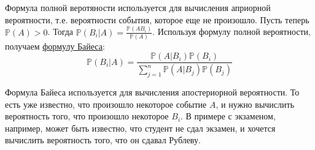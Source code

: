 \documentclass[12pt]{article}
\numberwithin{Th}{section}
\numberwithin{Def}{section}
\numberwithin{Lem}{section}
\numberwithin{St}{section}
\numberwithin{equation}{section}
\newcommand\Pro{\mathbb{P}}
\begin{document}
Формула полной веротяности используется для вычисления априорной вероятности, т.е. вероятности события, которое  еще не произошло.
Пусть теперь \\$\Pro(A) > 0$. Тогда $\Pro(B_i|A)=\frac{\Pro(AB_i)}{\Pro(A)}$. Используя формулу полной вероятности, получаем \underline{формулу Байеса}:
$$\Pro(B_i|A)=\frac{\Pro(A|B_i)\Pro(B_i)}{\sum\limits_{j=1}^n\Pro(A|B_j)\Pro(B_j)}$$

Формула Байеса используется для вычисления апостериорной вероятности. То есть уже известно, что произошло некоторое событие $A$, и нужно вычислить вероятность
того, что произошло некоторое $B_i$. В примере с экзаменом, например, может быть известно, что студент не сдал экзамен, и хочется вычислить вероятность того, что он
сдавал Рублеву.
\end{document}
